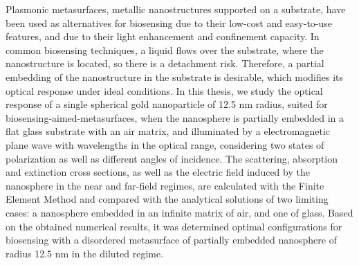 

\begin{abstracts}        %

\small
Plasmonic metasurfaces, metallic nanostructures supported on a substrate, have been used as alternatives for biosensing due to their low-cost and easy-to-use features, and due to their light enhancement and confinement capacity. In common biosensing techniques, a liquid flows over the substrate, where the nanostructure is located, so there is a  detachment risk. Therefore, a partial embedding of the nanostructure in the substrate is desirable, which modifies its optical response under ideal conditions. In this thesis, we study the optical response of a single spherical gold nanoparticle of 12.5 nm radius, suited for biosensing-aimed-metasurfaces, when the nanosphere is partially embedded in a flat glass substrate with an air matrix, and illuminated by a  electromagnetic plane wave with wavelengths in the optical range, considering two states of polarization as well as different angles of incidence. The scattering, absorption and extinction cross sections, as well as the electric field induced by the nanosphere in the near and far-field regimes, are calculated with the Finite Element Method and compared with the analytical solutions of two limiting cases: a nanosphere embedded in an infinite matrix of air, and one of glass. Based on the obtained numerical results, it was determined optimal configurations for  biosensing with a disordered metasurface of partially embedded nanosphere of radius 12.5 nm in the diluted regime.\\[2em]


\end{abstracts}
